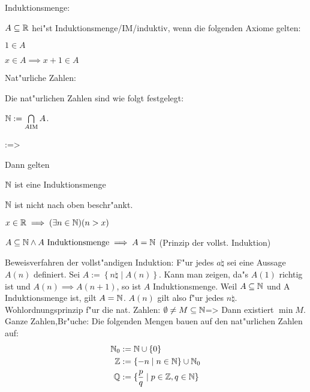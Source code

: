  Induktionsmenge:{
  $A\subseteq\mathbb R$ hei"st Induktionsmenge/IM/induktiv, wenn die
  folgenden Axiome gelten:
  \begin{stmts}
    \item $1 \in A$ 
    \item $x\in A \implies x+1\in A$ 
    \end{stmts}
  }
 Nat"urliche Zahlen:{
  Die nat"urlichen Zahlen sind wie folgt festgelegt:\par
  $\mathbb N:=\bigcap\limits_{A\text{IM}}A$.
}
\theorem:=>{
  Dann gelten
  \begin{stmts}
    \item $\mathbb N$ ist eine Induktionsmenge
    \item $\mathbb N$ ist nicht nach oben beschr"ankt.
    \item $x\in\mathbb R\implies(\exists n\in\mathbb N)(n>x)$
    \item $A \subseteq\mathbb N \land A\text{ Induktionsmenge}\implies A=\mathbb N $
      (Prinzip der vollst. Induktion)
    \end{stmts}
  }
\remark Beweisverfahren der vollst"andigen Induktion:{
  F"ur jedes $a\natural$ sei eine Aussage $A(n)$ definiert.
  Sei $A:=\left\{n\natural\mid A(n)\right\}$. Kann man zeigen,
  da"s $A(1)$ richtig ist und $A(n)\implies A(n+1)$, so ist $A$
  Induktionsmenge. Weil $A\subseteq\mathbb N$ und A Induktionsmenge ist,
  gilt $A=\mathbb N$. $A(n)$ gilt also f"ur jedes $n\natural$.
  }
\lessertheorem Wohlordnungsprinzip f"ur die nat. Zahlen:
  $\emptyset\ne M\subseteq\mathbb N$=>{
  Dann existiert $\min M$.
  }
 Ganze Zahlen,Br"uche:{
  Die folgenden Mengen bauen auf den nat"urlichen Zahlen auf:
  \begin{align*}
    \mathbb N_0&:=\mathbb N \cup \{0\}\\
    \mathbb Z&:=\{-n\mid n\in\mathbb N\}\cup\mathbb N_0\\
    \mathbb Q&:=\{\frac p q\mid p\in\mathbb Z,q\in\mathbb N\}
    \end{align*}
  }
